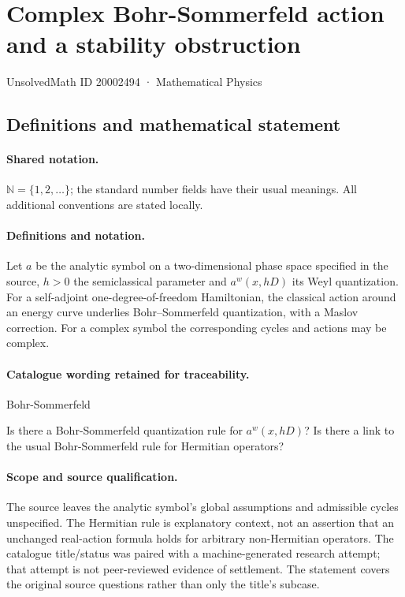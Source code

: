 \documentclass[11pt]{article}
\begin{document}
\setcounter{section}{20002493}
\section{Complex Bohr-Sommerfeld action and a stability obstruction}\label{20002494}
{\small UnsolvedMath ID 20002494 · Mathematical Physics}
\subsection{Definitions and mathematical statement}

\paragraph{Shared notation.}$\mathbb N=\{1,2,\ldots\}$; the standard number fields have their usual meanings. All additional conventions are stated locally.


\paragraph{Definitions and notation.}Let $a$ be the analytic symbol on a two-dimensional phase space specified in the source, $h>0$ the semiclassical parameter and $a^w(x,hD)$ its Weyl quantization. For a self-adjoint one-degree-of-freedom Hamiltonian, the classical action around an energy curve underlies Bohr--Sommerfeld quantization, with a Maslov correction. For a complex symbol the corresponding cycles and actions may be complex.

\paragraph{Catalogue wording retained for traceability.}
Bohr-Sommerfeld

Is there a Bohr-Sommerfeld quantization rule for $a^w(x,hD)$? Is there a link to the usual Bohr-Sommerfeld rule for Hermitian operators?
\paragraph{Scope and source qualification.}The source leaves the analytic symbol’s global assumptions and admissible cycles unspecified. The Hermitian rule is explanatory context, not an assertion that an unchanged real-action formula holds for arbitrary non-Hermitian operators. The catalogue title/status was paired with a machine-generated research attempt; that attempt is not peer-reviewed evidence of settlement. The statement covers the original source questions rather than only the title’s subcase.
\end{document}
